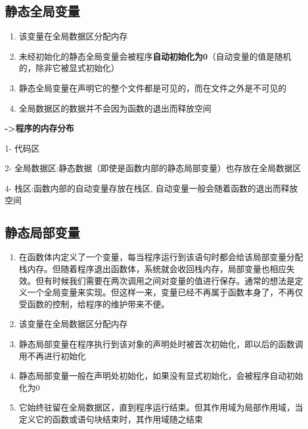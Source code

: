 \documentclass[UTF8,a4paper,12pt]{ctexbook} %
\begin{document}
	\subsection{静态全局变量}	
		       \begin{enumerate}[fullwidth,itemindent=2em,label=(\arabic*)]
			       \item  该变量在全局数据区分配内存
		       
			       \item  未经初始化的静态全局变量会被程序\textbf{自动初始化为0}（自动变量的值是随机的，除非它被显式初始化）
		       
			       \item  静态全局变量在声明它的整个文件都是可见的，而在文件之外是不可见的
		       
			       \item  全局数据区的数据并不会因为函数的退出而释放空间
		       \end{enumerate}
			       \textbf{->程序的内存分布}
		       
			       \quad  \color{red} {1- 代码区}
		       
			       \quad  \color{violet} {2- 全局数据区:静态数据（即使是函数内部的静态局部变量）也存放在全局数据区}
		       
			       \quad  \color{blue}{3- 堆区:由new产生的动态数据存放在堆区}
		       
			       \quad  \color{orange} {4- 栈区:函数内部的自动变量存放在栈区, 自动变量一般会随着函数的退出而释放空间}
			       \color{black}
	\subsection{静态局部变量}
		       \begin{enumerate}[fullwidth,itemindent=2em,label=(\arabic*)]
			       \item  在函数体内定义了一个变量，每当程序运行到该语句时都会给该局部变量分配栈内存。但随着程序退出函数体，系统就会收回栈内存，局部变量也相应失效。但有时候我们需要在两次调用之间对变量的值进行保存。通常的想法是定义一个全局变量来实现。但这样一来，变量已经不再属于函数本身了，不再仅受函数的控制，给程序的维护带来不便。
		       
			       \item  该变量在全局数据区分配内存
		       
			       \item  静态局部变量在程序执行到该对象的声明处时被首次初始化，即以后的函数调用不再进行初始化
		       
			       \item  静态局部变量一般在声明处初始化，如果没有显式初始化，会被程序自动初始化为0
		       
			       \item  它始终驻留在全局数据区，直到程序运行结束。但其作用域为局部作用域，当定义它的函数或语句块结束时，其作用域随之结束
		       \end{enumerate}
\end{document}

